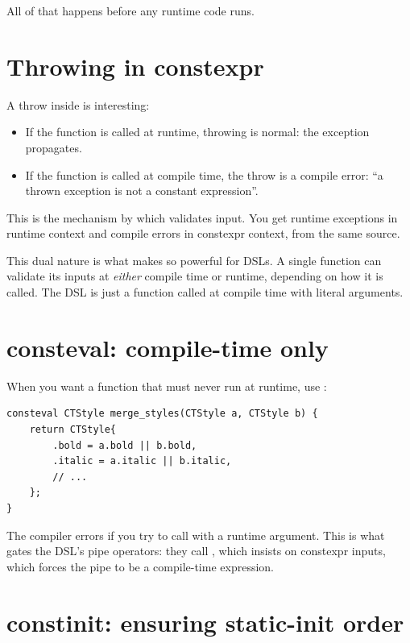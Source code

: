 All of that happens before any runtime code runs.

\section{Throwing in constexpr}

A throw inside  is interesting:

\begin{itemize}[leftmargin=*]
  \item If the function is called at runtime, throwing is
    normal: the exception propagates.
  \item If the function is called at compile time, the throw
    is a compile error: ``a thrown exception is not a constant
    expression''.
\end{itemize}

This is the mechanism by which  validates input.
You get runtime exceptions in runtime context and compile errors
in constexpr context, from the same source.

\begin{idea}
This dual nature is what makes  so powerful for
DSLs. A single function can validate its inputs at \emph{either}
compile time or runtime, depending on how it is called. The DSL
is just a function called at compile time with literal
arguments.
\end{idea}

\section{consteval: compile-time only}

When you want a function that must never run at runtime, use
:

\begin{lstlisting}
consteval CTStyle merge_styles(CTStyle a, CTStyle b) {
    return CTStyle{
        .bold = a.bold || b.bold,
        .italic = a.italic || b.italic,
        // ...
    };
}
\end{lstlisting}

The compiler errors if you try to call 
with a runtime argument. This is what gates the DSL's pipe
operators: they call , which insists on
constexpr inputs, which forces the pipe to be a compile-time
expression.

\section{constinit: ensuring static-init order}

